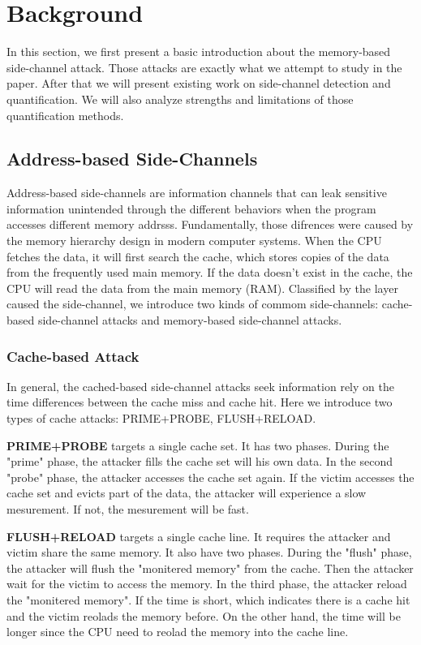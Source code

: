 \section{Background}
In this section, we first present a basic introduction about the 
memory-based side-channel attack. Those attacks 
are exactly what we attempt to study in the paper. After that we 
will present existing work on side-channel detection and quantification.
We will also analyze strengths and limitations of those quantification 
methods.

\subsection{Address-based Side-Channels}
Address-based side-channels are information channels that can leak sensitive information unintended
through the different behaviors when the program accesses different memory addrsss. Fundamentally,
those difrences were caused by the memory hierarchy design in modern computer systems. When the 
CPU fetches the data, it will first search the cache, which stores copies of the data from 
the frequently used main memory. If the data doesn't exist in the cache, the CPU will read
the data from the main memory (RAM). Classified by the layer caused the side-channel, we 
introduce two kinds of commom side-channels: cache-based side-channel attacks and memory-based
side-channel attacks.

\subsubsection{Cache-based Attack}
In general, the cached-based side-channel attacks seek information 
rely on the time differences between the cache miss
and cache hit. Here we introduce two types of cache attacks:
PRIME+PROBE, FLUSH+RELOAD.

\textbf{PRIME+PROBE} targets a single cache set. It has two phases. During the
"prime" phase, the attacker fills the cache set will his own data.
In the second "probe" phase, the attacker accesses the cache set
again. If the victim accesses the cache set and evicts part of 
the data, the attacker will experience a slow mesurement. If not, 
the mesurement will be fast.

\textbf{FLUSH+RELOAD} targets a single cache line. 
It requires the attacker and victim share the same memory.
It also have two phases. During the "flush" phase, the attacker 
will flush the "monitered memory" from the cache. Then the attacker
wait for the victim to access the memory. In the third phase, the 
attacker reload the "monitered memory". If the time is short, which
indicates there is a cache hit and the victim reolads the memory before. 
On the other hand, the time will be longer since the CPU need to reolad
the memory into the cache line. 

